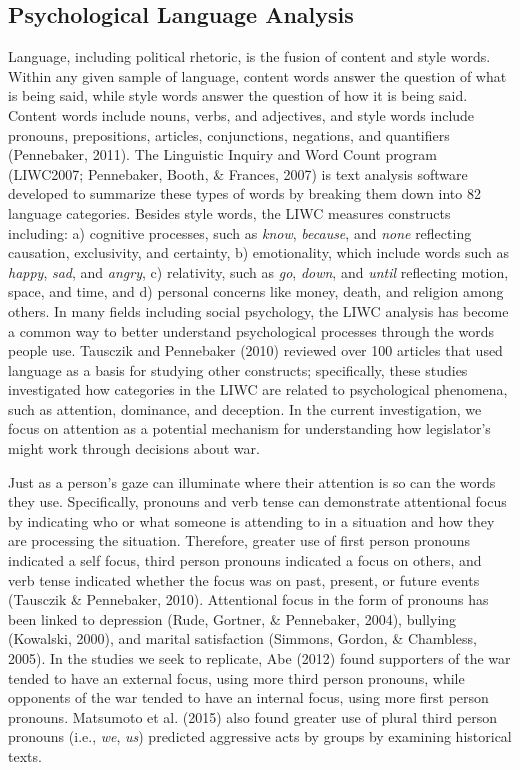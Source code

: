 \documentclass[english,,man]{apa6}
\theoremstyle{definition}
\theoremstyle{definition}
\theoremstyle{definition}
\theoremstyle{remark}
\begin{document}
\hypertarget{psychological-language-analysis}{%
\subsection{Psychological Language
Analysis}\label{psychological-language-analysis}}

Language, including political rhetoric, is the fusion of content and
style words. Within any given sample of language, content words answer
the question of what is being said, while style words answer the
question of how it is being said. Content words include nouns, verbs,
and adjectives, and style words include pronouns, prepositions,
articles, conjunctions, negations, and quantifiers (Pennebaker, 2011).
The Linguistic Inquiry and Word Count program (LIWC2007; Pennebaker,
Booth, \& Frances, 2007) is text analysis software developed to
summarize these types of words by breaking them down into 82 language
categories. Besides style words, the LIWC measures constructs including:
a) cognitive processes, such as \emph{know}, \emph{because}, and
\emph{none} reflecting causation, exclusivity, and certainty, b)
emotionality, which include words such as \emph{happy}, \emph{sad}, and
\emph{angry}, c) relativity, such as \emph{go}, \emph{down}, and
\emph{until} reflecting motion, space, and time, and d) personal
concerns like money, death, and religion among others. In many fields
including social psychology, the LIWC analysis has become a common way
to better understand psychological processes through the words people
use. Tausczik and Pennebaker (2010) reviewed over 100 articles that used
language as a basis for studying other constructs; specifically, these
studies investigated how categories in the LIWC are related to
psychological phenomena, such as attention, dominance, and deception. In
the current investigation, we focus on attention as a potential
mechanism for understanding how legislator's might work through
decisions about war.

Just as a person's gaze can illuminate where their attention is so can
the words they use. Specifically, pronouns and verb tense can
demonstrate attentional focus by indicating who or what someone is
attending to in a situation and how they are processing the situation.
Therefore, greater use of first person pronouns indicated a self focus,
third person pronouns indicated a focus on others, and verb tense
indicated whether the focus was on past, present, or future events
(Tausczik \& Pennebaker, 2010). Attentional focus in the form of
pronouns has been linked to depression (Rude, Gortner, \& Pennebaker,
2004), bullying (Kowalski, 2000), and marital satisfaction (Simmons,
Gordon, \& Chambless, 2005). In the studies we seek to replicate, Abe
(2012) found supporters of the war tended to have an external focus,
using more third person pronouns, while opponents of the war tended to
have an internal focus, using more first person pronouns. Matsumoto et
al. (2015) also found greater use of plural third person pronouns (i.e.,
\emph{we}, \emph{us}) predicted aggressive acts by groups by examining
historical texts.
\end{document}
